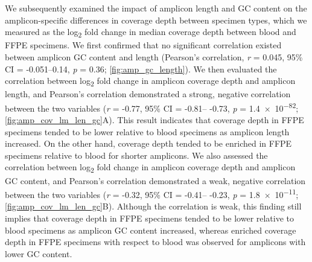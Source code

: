 We subsequently examined the impact of amplicon length and GC content on the amplicon-specific differences in coverage depth between specimen types, which we measured as the log\textsubscript{2} fold change in median coverage depth between blood and FFPE specimens. We first confirmed that no significant correlation existed between amplicon GC content and length (Pearson's correlation, \textit{r} = 0.045, 95\% CI = -0.051--0.14, \textit{p} = 0.36; \autoref{fig:amp_gc_length}). We then evaluated the correlation between log\textsubscript{2} fold change in amplicon coverage depth and amplicon length, and Pearson's correlation demonstrated a strong, negative correlation between the two variables (\textit{r} = -0.77, 95\% CI = -0.81-- -0.73, \textit{p} = \num{1.4e-82}; \autoref{fig:amp_cov_lm_len_gc}A). This result indicates that coverage depth in FFPE specimens tended to be lower relative to blood specimens as amplicon length increased. On the other hand, coverage depth tended to be enriched in FFPE specimens relative to blood for shorter amplicons. We also assessed the correlation between log\textsubscript{2} fold change in amplicon coverage depth and amplicon GC content, and Pearson's correlation demonstrated a weak, negative correlation between the two variables (\textit{r} = -0.32, 95\% CI = -0.41-- -0.23, \textit{p} = \num{1.8e-11}; \autoref{fig:amp_cov_lm_len_gc}B). Although the correlation is weak, this finding still implies that coverage depth in FFPE specimens tended to be lower relative to blood specimens as amplicon GC content increased, whereas enriched coverage depth in FFPE specimens with respect to blood was observed for amplicons with lower GC content.

